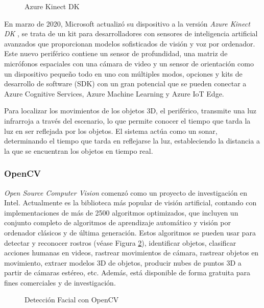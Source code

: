 \begin{figure}[h!]
    \centering
    \caption{Azure Kinect DK}
    \label{fig:AzureKinectDK}   
\end{figure}



En marzo de 2020, Microsoft actualizó su dispositivo a la versión \textit{Azure Kinect DK }\cite{AzureKinect}, se trata de un kit para desarrolladores con sensores de inteligencia artificial avanzados que proporcionan modelos sofisticados de visión y voz por ordenador. Este nuevo periférico contiene un sensor de profundidad, una matriz de micrófonos espaciales con una cámara de video y un sensor de orientación como un dispositivo pequeño todo en uno con múltiples modos, opciones y kits de desarrollo de software (SDK) con un gran potencial que se pueden conectar a Azure Cognitive Services, Azure Machine Learning y Azure IoT Edge.

Para localizar los movimientos de los objetos 3D, el periférico, transmite una luz infrarroja a través del escenario, lo que permite conocer el tiempo que tarda la luz en ser reflejada por los objetos. El sistema actúa como un sonar, determinando el tiempo que tarda en reflejarse la luz, estableciendo la distancia a la que se encuentran los objetos en tiempo real.


\subsubsection{OpenCV}
\label{cap3:sec:OpenCV}

\textit{Open Source Computer Vision}\cite{OpenCV} comenzó como un proyecto de investigación en Intel. Actualmente es la biblioteca más popular de visión artificial, contando con implementaciones de más de 2500 algoritmos optimizados, que incluyen un conjunto completo de algoritmos de aprendizaje automático y visión por ordenador clásicos y de última generación. Estos algoritmos se pueden usar para detectar y reconocer rostros (véase Figura \ref{fig:OpenCV}), identificar objetos, clasificar acciones humanas en videos, rastrear movimientos de cámara, rastrear objetos en movimiento, extraer modelos 3D de objetos, producir nubes de puntos 3D a partir de cámaras estéreo, etc. Además, está disponible de forma gratuita para fines comerciales y de investigación.

\begin{figure}[h!]
    \centering
    \caption{Detección Facial con OpenCV }
    \label{fig:OpenCV}  
\end{figure}

